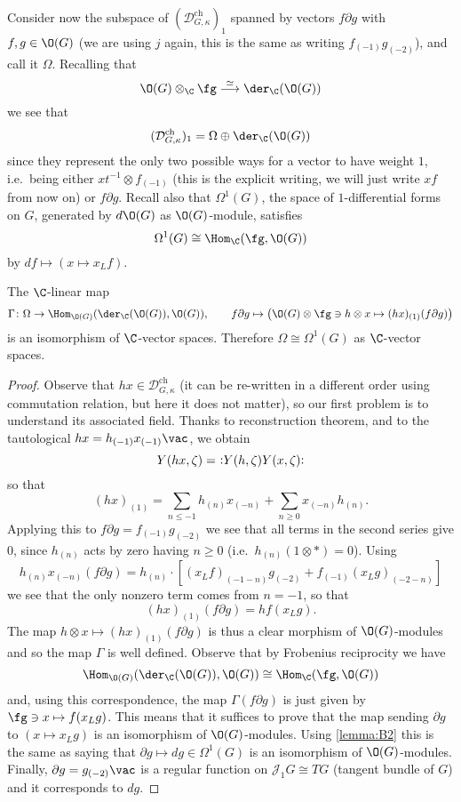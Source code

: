\documentclass[a4paper, 10pt]{article}
\newcommand{\Dc}{ \mathcal{D}^{\mathrm{ch}}_{G, \kappa} }         %
\newcommand\norder[1]{\vcentcolon\mathrel{#1}\vcentcolon}
\begin{document}
            Consider now the subspace of $(\Dc)_1$ spanned by vectors $f\partial g$ with $f, g \in \O(G)$ (we are using $j$ again, this is the same as writing $f_{(-1)}g_{(-2)}$), and call it $\Omega$. Recalling that \[\O(G) \otimes_{\C} \fg \stackrel{\simeq}{\longrightarrow} \der_{\C}(\O(G)) \] we see that \[(\Dc)_1 = \Omega \oplus \der_{\C}(\O(G)) \] since they represent the only two possible ways for a vector to have weight $1$, i.e.\ being either $xt^{-1} \otimes f_{(-1)}$ (this is the explicit writing, we will just write $xf$ from now on) or $f\partial g$.
            Recall also that $\Omega^1(G)$, the space of $1$-differential forms on $G$, generated by $d\O(G)$ as $\O(G)$-module, satisfies \[\Omega^1(G) \cong \Hom_{\C}(\fg, \O(G)) \] by $df \mapsto (x \mapsto x_Lf)$.
            \begin{lemma}
                \label{lemma:3_2}
                The $\C$-linear map \[\Gamma\colon \Omega \to \Hom_{\O(G)}(\der_{\C}(\O(G)), \O(G)), \qquad f\partial g \mapsto \left( \O(G) \otimes \fg \ni h \otimes x \mapsto (hx)_{(1)}(f\partial g)\right) \] is an isomorphism of $\C$-vector spaces. Therefore $\Omega \cong \Omega^1(G)$ as $\C$-vector spaces.
            \end{lemma}
            \begin{proof}
                Observe that $hx \in \Dc$ (it can be re-written in a different order using commutation relation, but here it does not matter), so our first problem is to understand its associated field. Thanks to reconstruction theorem, and to the tautological $hx = h_{(-1)}x_{(-1)}\vac$, we obtain \[Y(hx, \zeta) =\,\, \norder{Y(h, \zeta)Y(x, \zeta)} \] so that \[(hx)_{(1)} = \sum_{n \leq -1}h_{(n)}x_{(-n)} + \sum_{n\geq 0} x_{(-n)}h_{(n)}. \] Applying this to $f\partial g = f_{(-1)}g_{(-2)}$ we see that all terms in the second series give $0$, since $h_{(n)}$ acts by zero having $n \geq 0$ (i.e.\ $h_{(n)}(1 \otimes *) = 0$). Using \[h_{(n)}x_{(-n)}(f\partial g) = h_{(n)}\cdot \left[ (x_Lf)_{(-1-n)}g_{(-2)} + f_{(-1)}(x_Lg)_{(-2-n)} \right] \] we see that the only nonzero term comes from $n=-1$, so that \[(hx)_{(1)}(f\partial g) = hf(x_Lg). \] The map $h \otimes x \mapsto (hx)_{(1)}(f\partial g)$ is thus a clear morphism of $\O(G)$-modules and so the map $\Gamma$ is well defined.
                Observe that by Frobenius reciprocity we have \[\Hom_{\O(G)}(\der_{\C}(\O(G)), \O(G)) \cong \Hom_{\C}(\fg, \O(G)) \] and, using this correspondence, the map $\Gamma(f\partial g)$ is just given by $\fg \ni x \mapsto f(x_Lg)$. This means that it suffices to prove that the map sending $\partial g$ to $(x \mapsto x_Lg)$ is an isomorphism of $\O(G)$-modules. Using \cref{lemma:B2} this is the same as saying that $\partial g \mapsto dg \in \Omega^1(G)$ is an isomorphism of $\O(G)$-modules. Finally, $\partial g = g_{(-2)}\vac$ is a regular function on $\mathscr{J}_1G \cong TG$ (tangent bundle of $G$) and it corresponds to $dg$.
            \end{proof}
\end{document}
